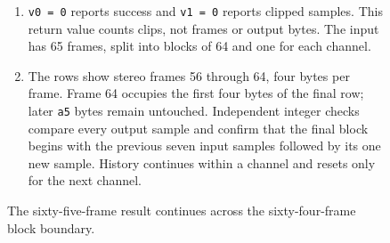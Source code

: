 \begin{figure}[htbp]
\begin{minipage}{\linewidth}
\begin{enumerate}
      \item \texttt{v0 = 0} reports success and \texttt{v1 = 0} reports clipped samples. This return value counts clips, not frames or output bytes. The input has 65 frames, split into blocks of 64 and one for each channel.
      \item The rows show stereo frames 56 through 64, four bytes per frame. Frame 64 occupies the first four bytes of the final row; later \texttt{a5} bytes remain untouched. Independent integer checks compare every output sample and confirm that the final block begins with the previous seven input samples followed by its one new sample. History continues within a channel and resets only for the next channel.
    \end{enumerate}
  \end{minipage}
  \caption{The sixty-five-frame result continues across the sixty-four-frame block boundary.}
  \label{capture:031-pcm-wav-f04}
  \label{pcm-wav-f04}
\end{figure}
\par
